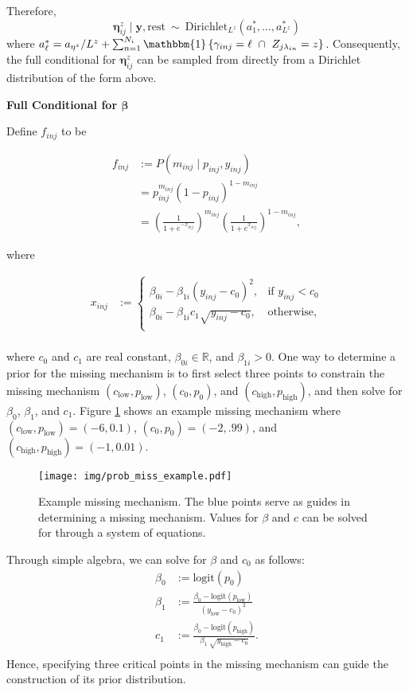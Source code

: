 \documentclass[12pt,]{article}
\newcommand{\p}[1]{\left(#1\right)}
\newcommand{\bc}[1]{ \left\{#1\right\} }
\def\beginmyfig{\begin{figure}[H]\center}
\def\endmyfig{\end{figure}}
\def\logit{\text{logit}}
\def\Dir{\text{Dirichlet}}
\def\lin{\lambda_{in}}
\def\y{\bm{y}}
\newcommand{\Ind}[1]{\mathbbm{1}\bc{#1}}
\def\rest{\text{rest}}
\def\beginmyfig{\begin{figure}[H]\center}
\def\endmyfig{\end{figure}}
\begin{document}
Therefore, \[
\bm{\eta}^z_{ij} \mid \y,\rest ~\sim~ \Dir_{L^z}\p{a^*_1,...,a^*_{L^z}}
\] where
\(a^*_\ell = a_{\eta^z}/L^z+\sum_{n=1}^{N_i}\Ind{\gamma_{inj}=\ell ~\cap~ Z_{j\lin}=z}\).
Consequently, the full conditional for \(\bm{\eta}^z_{ij}\) can be
sampled from directly from a Dirichlet distribution of the form above.
\vspace{2em}


\textbf{Full Conditional for $\bm\beta$}

Define \(f_{inj}\) to be

\begin{align*}
f_{inj} &:= P(m_{inj} \mid p_{inj}, y_{inj}) \\
&= p_{inj}^{m_{inj}} (1-p_{inj})^{1 - m_{inj}} \\
&= \left(\frac{1}{1+e^{-x_{inj}}} \right)^{m_{inj}}\left(\frac{1}{1+e^{x_{inj}}} \right)^{1-m_{inj}},
\end{align*}

where

\begin{align*}
  x_{inj} &:= \begin{cases}
  \beta_{0i} - \beta_{1i}(y_{inj}-c_0)^2, & \text{if } y_{inj} < c_0\nonumber \\
  \beta_{0i} - \beta_{1i}c_1\sqrt{y_{inj}-c_0}, & \text{otherwise}, \nonumber \\
  \end{cases}\\
\end{align*}

where \(c_0\) and \(c_1\) are real constant, $\beta_{0i} \in \mathbb{R}$, and
$\beta_{1i} > 0$.
One way to determine a prior for the missing mechanism is to first select three
points to constrain the missing mechanism $(c_\text{low}, p_\text{low})$,
$(c_0, p_0)$, and $(c_\text{high}, p_\text{high})$, and then 
solve for $\beta_0$, $\beta_1$, and $c_1$. Figure \ref{fig:prob-miss-eg} shows
an example missing mechanism where $(c_\text{low}, p_\text{low}) = (-6,0.1)$,
$(c_0, p_0)=(-2,.99)$, and $(c_\text{high}, p_\text{high}) = (-1,0.01)$.
\beginmyfig
\texttt{[image: img/prob\_miss\_example.pdf]}
\caption{Example missing mechanism. The blue points serve as guides in
determining a missing mechanism. Values for $\beta$ and $c$ can be solved for
through a system of equations.}
\label{fig:prob-miss-eg}
\endmyfig

Through simple algebra, we can solve for $\beta$ and $c_0$ as follows:
\begin{align*}
  \beta_0 &:= \logit(p_0) \\
  \beta_1 &:= \frac{\beta_0 - \logit(p_\text{low})}{(y_\text{low} - c_0)^2} \\
  c_1 &:= \frac{\beta_0 - \logit(p_\text{high})}{\beta_1 ~ \sqrt{y_\text{high} - c_0} }. \\
\end{align*}
Hence, specifying three critical points in the missing mechanism can guide
the construction of its prior distribution.
\vspace{2em}
\end{document}
